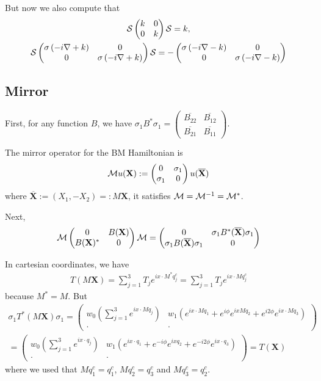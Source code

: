 \documentclass[11pt,a4paper,reqno,french,tikz]{amsart}
\newcommand{\pa}[1]{\left( #1 \right)} %
\newcommand{\na}{\nabla} %
\newcommand{\mat}[1]{\begin{pmatrix} #1 \end{pmatrix}} %
\def\bX{{\mathbf X}}
\begin{document}
But now we also compute that
\begin{multline*}
	\cS \mat{k & 0 \\ 0 & k} \cS = k, \\
	\cS \mat{\sigma \pa{-i\na +k} & 0 \\ 0 & \sigma\pa{-i\na +k}} \cS = -\mat{\sigma\pa{-i\na -k} & 0 \\ 0 & \sigma\pa{-i\na -k}}
\end{multline*}

\subsection{Mirror}%
\label{sub:mirror}

First, for any function $B$, we have $\sigma_1 B^* \sigma_1 = \mat{\overline{B_{22}} & \overline{B_{12}} \\ \overline{B_{21}} & \overline{B_{11}}}$.


The mirror operator for the BM Hamiltonian is
\begin{align*}
	\cM u(\bX) := \mat{0 & \sigma_1 \\ \sigma_1 & 0} u(\overline{\bX})
\end{align*}
where $\overline{\bX} := (X_1,-X_2) =: M \bX$, it satisfies $\mathcal{M} = \mathcal{M}^{-1} = \mathcal{M}^*$.


Next,
\begin{align*}
	\cM \mat{0 & B(\bX) \\ B(\bX)^* & 0} \cM = \mat{0 & \sigma_1 B^*(\overline{\bX}) \sigma_1 \\ \sigma_1 B(\overline{\bX}) \sigma_1 & 0}%
\end{align*}

In cartesian coordinates, we have 
\begin{align*}
T(M \bX) = \sum_{j=1}^3 T_j e^{i  x \cdot M^*q^c_j} = \sum_{j=1}^3 T_j e^{i x \cdot Mq^c_j}
\end{align*}
because $M^* = M$. But
\begin{multline*}
	\sigma_1 T^*(M \bX) \sigma_1 = \mat{ w_0 \pa{\sum_{j=1}^3 e^{i x \cdot Mq_j}} & w_1\pa{e^{ix \cdot M q_1} + e^{i\phi} e^{ix Mq_2} + e^{i2\phi} e^{ix \cdot Mq_3}} \\ \cdot & \cdot} \\
	= \mat{ w_0 \pa{\sum_{j=1}^3 e^{i x \cdot q_j}} & w_1\pa{e^{ix \cdot q_1} + e^{-i\phi} e^{ix q_2} + e^{-i2\phi} e^{ix \cdot q_3}} \\ \cdot & \cdot} = T(\bX)
\end{multline*}
where we used that $M q_1^c = q_1^c$, $M q_2^c = q_3^c$ and $M q_3^c = q_2^c$.
\end{document}
